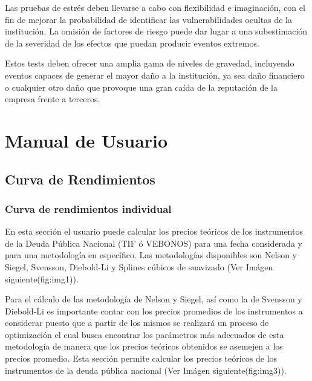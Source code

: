 \documentclass[
  12pt,
]{krantz}
\begin{document}
Las pruebas de estrés deben llevarse a cabo con flexibilidad e imaginación, con el fin de mejorar la probabilidad de identificar las vulnerabilidades ocultas de la institución. La omisión de factores de riesgo puede dar lugar a una subestimación de la severidad de los efectos que puedan producir eventos extremos.

Estos tests deben ofrecer una amplia gama de niveles de gravedad, incluyendo eventos capaces de generar el mayor daño a la institución, ya sea daño financiero o cualquier otro daño que provoque una gran caída de la reputación de la empresa frente a terceros.

\mainmatter

\mainmatter

\hypertarget{manual-de-usuario}{%
\chapter{Manual de Usuario}\label{manual-de-usuario}}

\hypertarget{curva-de-rendimientos-1}{%
\section{Curva de Rendimientos}\label{curva-de-rendimientos-1}}

\hypertarget{curva-de-rendimientos-individual}{%
\subsection{Curva de rendimientos individual}\label{curva-de-rendimientos-individual}}

En esta sección el usuario puede calcular los precios teóricos de los instrumentos de la Deuda Pública Nacional (TIF ó VEBONOS) para una fecha considerada y para una metodología en específico. Las metodologías disponibles son Nelson y Siegel, Svensson, Diebold-Li y Splines cúbicos de suavizado (Ver Imágen siguiente(fig:img1)).

Para el cálculo de las metodología de Nelson y Siegel, así como la de Svensson y Diebold-Li es importante contar con los precios promedios de los instrumentos a considerar puesto que a partir de los mismos se realizará un proceso de optimización el cual busca encontrar los parámetros más adecuados de esta metodología de manera que los precios teóricos obtenidos se asemejen a los precios promedio. Esta sección permite calcular los precios teóricos de los instrumentos de la deuda pública nacional (Ver Imágen siguiente(fig:img3)).
\end{document}
